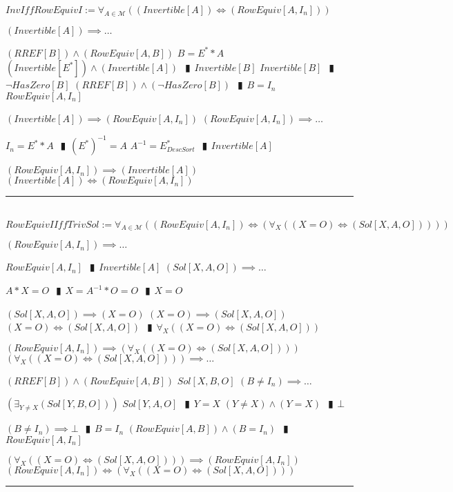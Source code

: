 \documentclass{book}
\newcommand{\abr}{:=}
\newcommand{\pipe}{$\phantom{(}\vrectangleblack\phantom{)}$}
\begin{document}
$InvIffRowEquivI \abr \forall_{A \in \mathcal{M}}((Invertible[A]) \iff (RowEquiv[A, I_n]))$
\begin{enumerate}
  \lit $(Invertible[A]) \implies \ldots$
  \begin{enumerate}
    \lit $(RREF[B]) \land (RowEquiv[A, B])$
    \lit $B = E^* * A$
    \lit $(Invertible[E^*]) \land (Invertible[A])$ \pipe $Invertible[B]$
    \lit $Invertible[B]$ \pipe $\lnot HasZero[B]$
    \lit $(RREF[B]) \land (\lnot HasZero[B])$ \pipe $B = I_n$
    \lit $RowEquiv[A, I_n]$
  \end{enumerate}
  \lit $(Invertible[A]) \implies (RowEquiv[A, I_n])$
  \lit $(RowEquiv[A, I_n]) \implies \ldots$
  \begin{enumerate}
    \lit $I_n = E^* * A$ \pipe $(E^*)^{-1} = A$
    \lit $A^{-1} = E^*_{DescSort}$ \pipe $Invertible[A]$
  \end{enumerate}
  \lit $(RowEquiv[A, I_n]) \implies (Invertible[A])$
  \lit $(Invertible[A]) \iff (RowEquiv[A, I_n])$
\end{enumerate} \vspace{.75mm} \hrule \vspace{.75mm} \ \\ %

$RowEquivIIffTrivSol \abr \forall_{A \in \mathcal{M}}((RowEquiv[A, I_n]) \iff (\forall_{X}((X = O) \iff (Sol[X, A, O]))))$
\begin{enumerate}
  \lit $(RowEquiv[A, I_n]) \implies \ldots$
  \begin{enumerate}
    \lit $RowEquiv[A, I_n]$ \pipe $Invertible[A]$
    \lit $(Sol[X, A, O]) \implies \ldots$
    \begin{enumerate}
      \lit $A * X = O$ \pipe $X = A^{-1} * O = O$ \pipe $X = O$
    \end{enumerate}
    \lit $(Sol[X, A, O]) \implies (X = O)$
    \lit $(X = O) \implies (Sol[X, A, O])$
    \lit $(X = O) \iff (Sol[X, A, O])$ \pipe $\forall_{X}((X = O) \iff (Sol[X, A, O]))$
  \end{enumerate}
  \lit $(RowEquiv[A, I_n]) \implies (\forall_{X}((X = O) \iff (Sol[X, A, O])))$
  \lit $(\forall_{X}((X = O) \iff (Sol[X, A, O]))) \implies \ldots$
  \begin{enumerate}
    \lit $(RREF[B]) \land (RowEquiv[A, B])$
    \lit $Sol[X, B, O]$
    \lit $(B \neq I_n) \implies \ldots$
    \begin{enumerate}
      \lit $(\exists_{Y \neq X}(Sol[Y, B, O]))$
      \lit $Sol[Y, A, O]$ \pipe $Y = X$
      \lit $(Y \neq X) \land (Y = X)$ \pipe $\bot$
    \end{enumerate}
    \lit $(B \neq I_n) \implies \bot$ \pipe $B = I_n$
    \lit $(RowEquiv[A, B]) \land (B = I_n)$ \pipe $RowEquiv[A, I_n]$
  \end{enumerate}
  \lit $(\forall_{X}((X = O) \iff (Sol[X, A, O]))) \implies (RowEquiv[A, I_n])$
  \lit $(RowEquiv[A, I_n]) \iff (\forall_{X}((X = O) \iff (Sol[X, A, O])))$
\end{enumerate} \vspace{.75mm} \hrule \vspace{.75mm} \ \\ 
\end{document}
